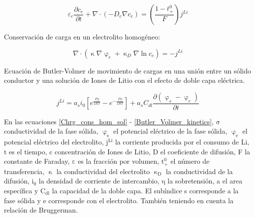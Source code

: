 \documentclass[10pt,a4paper]{article}
\begin{document}
	\begin{figure}[h!]
		\begin{center}
			\begin{equation}
				\varepsilon_e\frac{\partial c_e}{\partial t} + \nabla \cdot (-D_e\nabla c_e) = (\frac{1-t_+^0}{F})j^{Li}
				\label{Mass_cons_hom_electrolyte}
			\end{equation}	
		\end{center}
	\end{figure}
	
	\noindent Conservación de carga en un electrolito homogéneo:
	
	\begin{figure}[h!]
		\begin{center}
			\begin{equation}
				\nabla \cdot (\upkappa \nabla \upvarphi_e + \upkappa_D \nabla \ln c_e) = -j^{Li}
				\label{Chrg_cons_hom_electrolyte}
			\end{equation}	
		\end{center}
	\end{figure}
	
	\noindent Ecuación de Butler-Volmer de movimiento de cargas en una unión 
    entre un sólido conductor y una solución de Iones de Litio con el efecto de 
    doble capa eléctrica.
	
	\begin{figure}[h!]
		\begin{center}
			\begin{equation}
				j^{Li} = a_si_0[{e^\frac{F\eta}{2RT}-e^{-\frac{F\eta}{2RT}}}]+ a_sC_{dl}\frac{\partial{(\upvarphi_s - \upvarphi_e)}}{\partial t}
				\label{Butler_Volmer_kinetics}
			\end{equation}	
		\end{center}
	\end{figure}
	
	En las ecuaciones \ref{Chrg_cons_hom_sol} - \ref{Butler_Volmer_kinetics}, 
    $\mathrm{\sigma}$  conductividad de la fase sólida, $\mathrm{\upvarphi_s}$ 
    el potencial eléctrico de la fase sólida, $\mathrm{\upvarphi_e}$ el 
    potencial eléctrico del electrolito, $\mathrm{j^{Li}}$ la corriente 
    producida por el consumo de Li, t es el tiempo, c concentración de Iones de 
    Litio, D el coeficiente de difusión, F la constante de Faraday,
    $\mathrm{\varepsilon}$ es la fracción por volumen,
    $\mathrm{t_+^0}$ el número de transferencia, $\mathrm{\upkappa}$ la 
    conductividad del electrolito $\mathrm{\upkappa_D}$ la conductividad de la 
    difusión, $\mathrm{i_0}$ la densidad de corriente de intercambio, 
    $\mathrm{\eta}$ la sobretensión, a el area específica y $\mathrm{C_{dl}}$ 
    la capacidad de la doble capa. El subíndice s corresponde a la fase sólida y 
    e corresponde con el electrolito. 
    También teniendo en cuenta la relación de Bruggerman.
\end{document}
